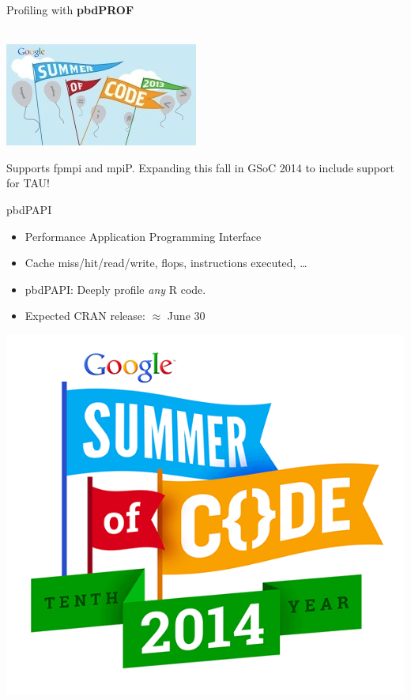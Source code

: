 \begin{frame}[fragile]
\begin{block}{Profiling with \textbf{pbdPROF}}
\begin{minipage}[t]{.4\textwidth}
    \\[.1cm]
    \includegraphics[scale=0.3]{../common/pics/gsoc}
  \end{minipage}
  \centering
  Supports fpmpi and mpiP.  Expanding this fall in GSoC 2014 to include support 
for TAU!
  \end{block}
\end{frame}

\begin{frame}[fragile]
\small
  \begin{block}{pbdPAPI}
  \begin{minipage}[t]{.78\textwidth}
  \vspace{0pt}
  \begin{itemize}
    \item Performance Application Programming Interface
    \item Cache miss/hit/read/write, flops, instructions executed, \dots
    \item pbdPAPI: Deeply profile \emph{any} R code.
    \item Expected CRAN release: $\approx$ June 30
  \end{itemize}
  \end{minipage}
  \hfill
  \begin{minipage}[t]{.2\textwidth}
  \vspace{0pt}
  \hspace*{-.7cm}
  \includegraphics[width=1.2\textwidth]{../common/pics/gsoc_2014}

\end{minipage}
\end{block}
\end{frame}
